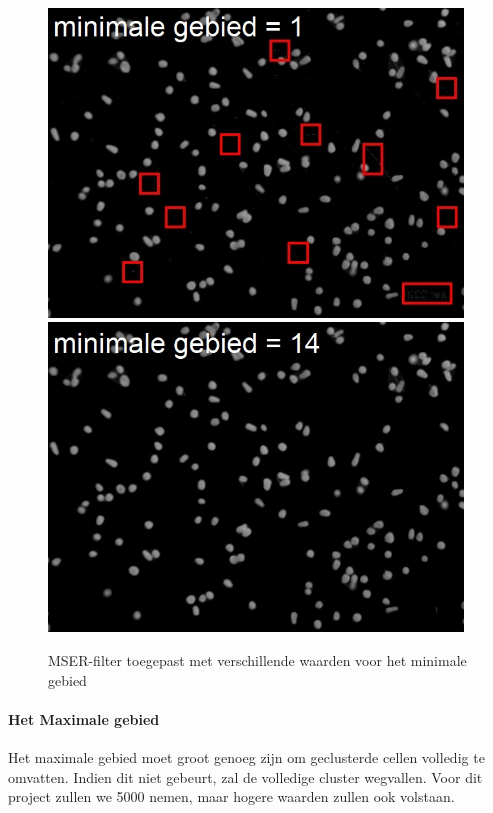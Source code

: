 \documentclass{article}
\begin{document}
\begin{multicols}{2}
\begin{figure}[H]
\centering
\includegraphics[width=0.98\textwidth]{images/min_area_1.jpg}
\includegraphics[width=0.98\textwidth]{images/min_area_14.jpg}
\caption{\label{fig:min_area_mser}MSER-filter toegepast met verschillende waarden voor het minimale gebied}
\end{figure}

\paragraph{Het Maximale gebied}
Het maximale gebied moet groot genoeg zijn om geclusterde cellen volledig te omvatten. Indien dit niet gebeurt, zal de volledige cluster wegvallen. Voor dit project zullen we 5000 nemen, maar hogere waarden zullen ook volstaan.


\end{multicols}
\end{document}
